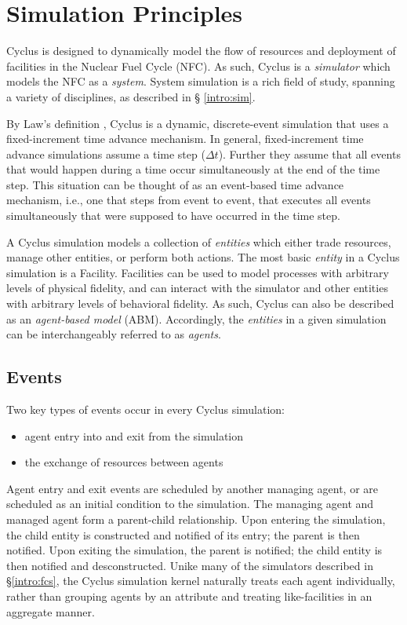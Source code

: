 
\section{Simulation Principles}\label{abm:sim}

Cyclus is designed to dynamically model the flow of resources and deployment of
facilities in the Nuclear Fuel Cycle (NFC). As such, Cyclus is a
\textit{simulator} which models the NFC as a \textit{system}. System simulation
is a rich field of study, spanning a variety of disciplines, as described in \S
\ref{intro:sim}.

By Law's definition \cite{Law:1999:SMA:554952}, Cyclus is a dynamic,
discrete-event simulation that uses a fixed-increment time advance mechanism. In
general, fixed-increment time advance simulations assume a time step ($\Delta
t$). Further they assume that all events that would happen during a time occur
simultaneously at the end of the time step. This situation can be thought of as
an event-based time advance mechanism, i.e., one that steps from event to event,
that executes all events simultaneously that were supposed to have occurred in
the time step.

A Cyclus simulation models a collection of \textit{entities} which either trade
resources, manage other entities, or perform both actions. The most basic
\textit{entity} in a Cyclus simulation is a Facility. Facilities can be used to
model processes with arbitrary levels of physical fidelity, and can interact
with the simulator and other entities with arbitrary levels of behavioral
fidelity. As such, Cyclus can also be described as an \textit{agent-based model}
(ABM). Accordingly, the \textit{entities} in a given simulation can be
interchangeably referred to as \textit{agents}.

\subsection{Events}

Two key types of events occur in every Cyclus simulation:

\begin{itemize}
\item agent entry into and exit from the simulation
\item the exchange of resources between agents
\end{itemize}

Agent entry and exit events are scheduled by another managing agent, or are
scheduled as an initial condition to the simulation. The managing agent and
managed agent form a parent-child relationship. Upon entering the simulation,
the child entity is constructed and notified of its entry; the parent is then
notified. Upon exiting the simulation, the parent is notified; the child entity
is then notified and desconstructed. Unike many of the simulators described in
\S \ref{intro:fcs}, the Cyclus simulation kernel naturally treats each agent
individually, rather than grouping agents by an attribute and treating
like-facilities in an aggregate manner.

